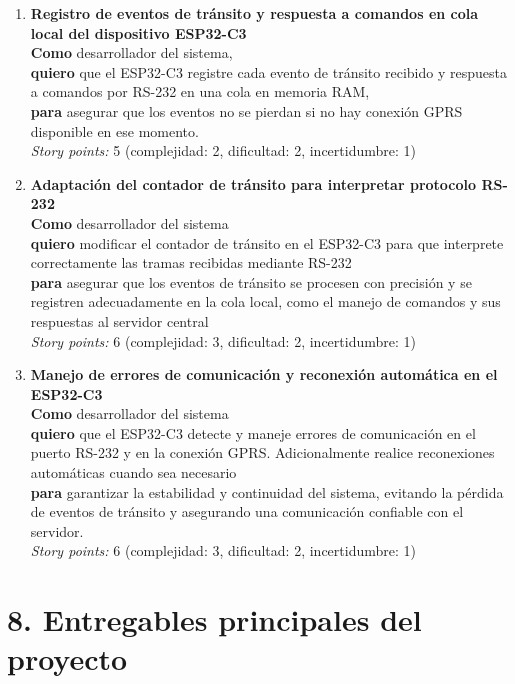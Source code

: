 \documentclass[
11pt, %
]{charter}
\begin{document}
\begin{enumerate}
\item \textbf{Registro de eventos de tránsito y respuesta a comandos en cola local del dispositivo ESP32-C3}\\
\textbf{Como} desarrollador del sistema,\\
\textbf{quiero} que el ESP32-C3 registre cada evento de tránsito recibido y respuesta a comandos por RS-232 en una cola en memoria RAM,\\
\textbf{para} asegurar que los eventos no se pierdan si no hay conexión GPRS disponible en ese momento.\\
\textit{Story points:} 5 (complejidad: 2, dificultad: 2, incertidumbre: 1)

\item \textbf{Adaptación del contador de tránsito para interpretar protocolo RS-232}\\
\textbf{Como} desarrollador del sistema\\
\textbf{quiero} modificar el contador de tránsito en el ESP32-C3 para que interprete correctamente las tramas recibidas mediante RS-232\\
\textbf{para} asegurar que los eventos de tránsito se procesen con precisión y se registren adecuadamente en la cola local, como el manejo de comandos y sus respuestas al servidor central\\
\textit{Story points:} 6 (complejidad: 3, dificultad: 2, incertidumbre: 1)

\item \textbf{Manejo de errores de comunicación y reconexión automática en el ESP32-C3}\\
\textbf{Como} desarrollador del sistema\\
\textbf{quiero} que el ESP32-C3 detecte y maneje errores de comunicación en el puerto RS-232 y en la conexión GPRS. Adicionalmente realice reconexiones automáticas cuando sea necesario\\
\textbf{para} garantizar la estabilidad y continuidad del sistema, evitando la pérdida de eventos de tránsito y asegurando una comunicación confiable con el servidor.\\
\textit{Story points:} 6 (complejidad: 3, dificultad: 2, incertidumbre: 1)


\end{enumerate}

\section{8. Entregables principales del proyecto}
\label{sec:entregables}
\end{document}
